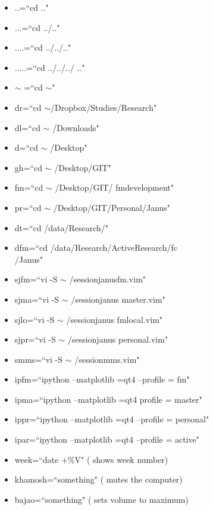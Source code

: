 \documentclass[twoside,a4paper]{article}
\newcommand{\tcb}{\color{blue}} \newcommand{\tcc}{\color{cyan}} \newcommand{\tcr}{\color{red}}
\newcommand{\tcg}{\color{gray}} \newcommand{\tco}{\color{orange}} \newcommand{\tcp}{\color{purple}}
\newcommand{\tck}{\color{black}}
\begin{document}
\begin{itemize}
    \item \tcr ..\tck =\tcb ``cd .."
    \item \tcr ...\tck =\tcb ``cd ../.."
    \item \tcr ....\tck =\tcb ``cd ../../.."
    \item \tcr .....\tck =\tcb ``cd ../../../ .."
    \item \tcr $\sim$ \tck =\tcb ``cd $\sim$"
    \item \tcr dr\tck =\tcb ``cd $\sim$/Dropbox/Studies/Research"
    \item \tcr dl\tck =\tcb ``cd $\sim$ /Downloads"
    \item \tcr d\tck =\tcb ``cd $\sim$ /Desktop"
    \item \tcr gh\tck =\tcb ``cd $\sim$ /Desktop/GIT"
    \item \tcr fm\tck =\tcb ``cd $\sim$ /Desktop/GIT/ fm\textunderscore development"
    \item \tcr pr\tck =\tcb ``cd $\sim$ /Desktop/GIT/Personal/Janus"
    \item \tcr dt\tck =\tcb ``cd /data/Research/"
    \item \tcr dfm\tck =\tcb ``cd /data/Research/Active\textunderscore Research/fc \\
          /Janus"
    \item \tcr sjfm\tck =\tcb ``vi -S $\sim$ /session\textunderscore janus\textunderscore fm.vim"
    \item \tcr sjma\tck =\tcb ``vi -S $\sim$ /session\textunderscore janus\textunderscore
          master.vim"
    \item \tcr sjlo\tck =\tcb ``vi -S $\sim$ /session\textunderscore janus\textunderscore
          fm\textunderscore local.vim"
    \item \tcr sjpr\tck =\tcb ``vi -S $\sim$ /session\textunderscore janus\textunderscore
          personal.vim"
    \item \tcr smms\tck =\tcb ``vi -S $\sim$ /session\textunderscore mms.vim"
    \item \tcr ipfm\tck =\tcb ``ipython --matplotlib =qt4 --profile = fm"
    \item \tcr ipma\tck =\tcb ``ipython --matplotlib =qt4 profile = master"
    \item \tcr ippr\tck =\tcb ``ipython --matplotlib =qt4 --profile = personal"
    \item \tcr ipar\tck =\tcb ``ipython --matplotlib =qt4 --profile = active"
    \item \tcr week\tck =\tcb ``date +$\%$V" \tcg  ( shows week number)
    \item \tcr khamosh\tck =\tcb ``something" \tcg  ( mutes the computer)
    \item \tcr bajao\tck =\tcb ``something" \tcg  ( sets volume to maximum)
\end{itemize}
\vfill \eject
\end{document}
